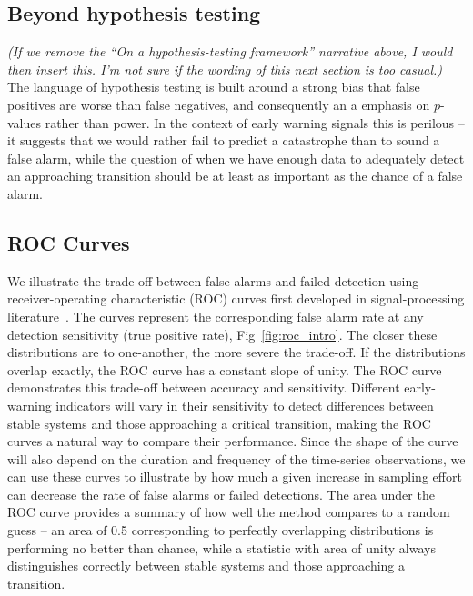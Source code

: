 \documentclass[authoryear,review,11pt]{elsarticle}
\newcommand{\cb}[1]{{\it (#1)}}
\begin{document}
\subsection*{Beyond hypothesis testing}
\cb{If we remove the ``On a hypothesis-testing framework'' narrative above, I would then insert this.  I'm not sure if the wording of this next section is too casual.}
The language of hypothesis testing is built around a strong bias that false positives are worse than false negatives, 
and consequently an a emphasis on $p$-values rather than power.  
In the context of early warning signals this is perilous -- 
it suggests that we would rather fail to predict a catastrophe than to sound a false alarm, 
while the question of when we have enough data to adequately detect an approaching transition
should be at least as important as the chance of a false alarm.  


\subsection*{ROC Curves}
We illustrate the trade-off between false alarms and failed detection using 
receiver-operating characteristic (ROC) curves first developed in signal-processing literature~\citep{Green1989, Keller2009}⁠. 
The curves represent the corresponding false alarm rate at any detection sensitivity (true positive rate), Fig~\ref{fig:roc_intro}.
The closer these distributions are to one-another, the more severe the trade-off.  
If the distributions overlap exactly, the ROC curve has a constant slope of unity.  
The ROC curve demonstrates this trade-off between accuracy and sensitivity.  
Different early-warning indicators will vary in their sensitivity to detect differences
between stable systems and those approaching a critical transition,
making the ROC curves a natural way to compare their performance.  
Since the shape of the curve will also depend on the duration and frequency of the time-series observations,
we can use these curves to illustrate by how much a given increase in sampling effort can decrease the rate of false alarms or failed detections.  
The area under the ROC curve provides a summary of how well the method compares to a random guess --
an area of 0.5 corresponding to perfectly overlapping distributions is performing no better than chance,
while a statistic with area of unity always distinguishes correctly between stable systems and those approaching a transition. 
\end{document}
